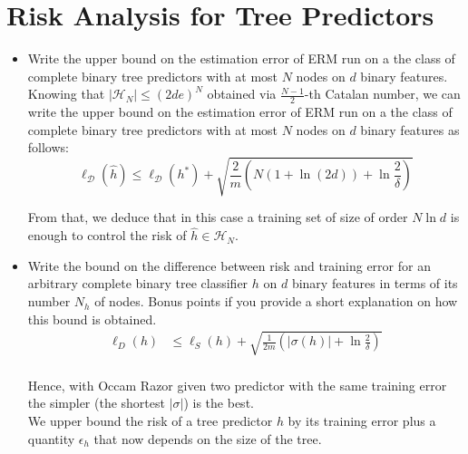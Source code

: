 \newpage
\section{Risk Analysis for Tree Predictors}

\begin{itemize}
   
    \item Write the upper bound on the estimation error of ERM run on a the class of complete binary tree predictors with at most $N$ nodes on $d$ binary features.\\

        Knowing that $|\mathcal{H}_N| \leq (2de)^N$ obtained via $\frac{N-1}{2}$-th Catalan number, we can write the upper bound on the estimation error of ERM run on a the class of complete binary tree predictors with at most $N$ nodes on $d$ binary features as follows:
        $$
        \ell_{\mathcal{D}}(\hat{h}) \leq \ell_{\mathcal{D}}(h^{*}) + \sqrt{\frac{2}{m} \left(N(1 + \ln (2d)) + \ln \frac{2}{\delta} \right)}
        $$

        From that, we deduce that in this case a training set of size of order $N \ln d$ is enough to control the risk of $\hat{h} \in \mathcal{H}_N$.\\

    \item Write the bound on the difference between risk and training error for an arbitrary complete binary tree classifier $h$ on $d$ binary features in terms of its number $N_h$ of nodes. Bonus points if you provide a short explanation on how this bound is obtained.\\
    
        \begin{equation}
            \begin{split}
                \ell_{D}(h) & \leq \ell_{S}(h) + \sqrt{\frac{1}{2m} \left(|\sigma(h)| + \ln \frac{2}{\delta} \right)}\\
            \end{split}
        \end{equation}

        Hence, with Occam Razor given two predictor with the same training error the simpler (the shortest $|\sigma|$) is the best.\\ 

        We upper bound the risk of a tree predictor $h$ by its training error plus a quantity $\epsilon_h$ that now depends on the size of the tree.


\end{itemize}
